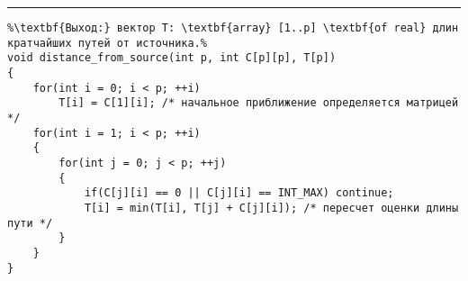 \vspace{5pt} \hrule
\begin{lstlisting}[caption={Определение расстояний от источника в бесконтурном графе}, label=p290, escapechar=\%]
%\noindent\textbf{Вход:} орграф G(V, E), заданный матрицей длин дуг C: \textbf{array} [1..p,1..p] \textbf{of real} и списками предшествующих узлов $\Gamma^{-1}$; источник имеет номер 1.\\%
%\textbf{Выход:} вектор T: \textbf{array} [1..p] \textbf{of real} длин кратчайших путей от источника.%
void distance_from_source(int p, int C[p][p], T[p])
{
	for(int i = 0; i < p; ++i)
		T[i] = C[1][i]; /* начальное приближение определяется матрицей */
	for(int i = 1; i < p; ++i)
	{
		for(int j = 0; j < p; ++j)
		{
			if(C[j][i] == 0 || C[j][i] == INT_MAX) continue;
			T[i] = min(T[i], T[j] + C[j][i]); /* пересчет оценки длины пути */
		}
	}
}
\end{lstlisting}
